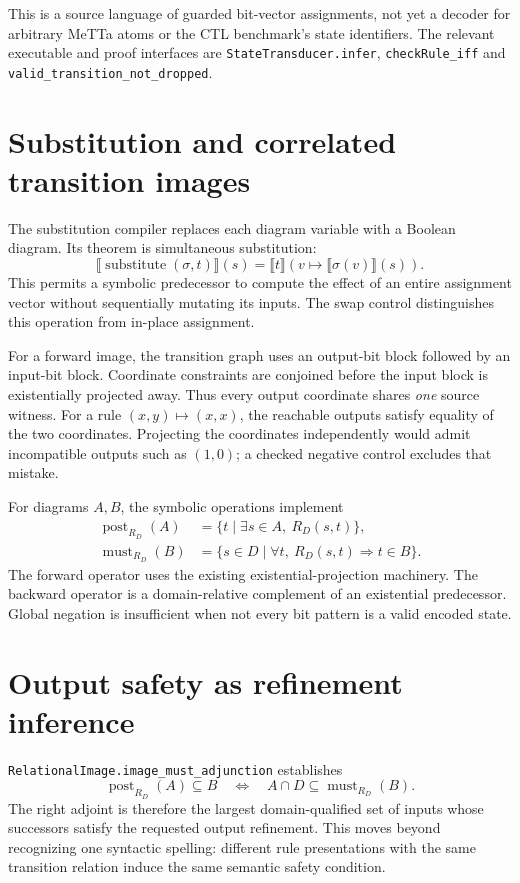 \documentclass[11pt,a4paper]{article}
\newcommand{\code}[1]{\nolinkurl{#1}}
\begin{document}
This is a source language of guarded bit-vector assignments, not yet a
decoder for arbitrary MeTTa atoms or the CTL benchmark's state identifiers.
The relevant executable and proof interfaces are
\code{StateTransducer.infer}, \code{checkRule_iff} and
\code{valid_transition_not_dropped}.

\section{Substitution and correlated transition images}

The substitution compiler replaces each diagram variable with a Boolean
diagram. Its theorem is simultaneous substitution:
\[
 \llbracket\operatorname{substitute}(\sigma,t)\rrbracket(s)
 =\llbracket t\rrbracket
       (v\mapsto\llbracket\sigma(v)\rrbracket(s)).
\]
This permits a symbolic predecessor to compute the effect of an entire
assignment vector without sequentially mutating its inputs. The swap control
distinguishes this operation from in-place assignment.

For a forward image, the transition graph uses an output-bit block followed
by an input-bit block. Coordinate constraints are conjoined before the input
block is existentially projected away. Thus every output coordinate shares
\emph{one} source witness. For a rule $(x,y)\mapsto(x,x)$, the reachable
outputs satisfy equality of the two coordinates. Projecting the coordinates
independently would admit incompatible outputs such as $(1,0)$; a checked
negative control excludes that mistake.

For diagrams $A,B$, the symbolic operations implement
\begin{align*}
 \operatorname{post}_{R_D}(A)
   &=\{t\mid\exists s\in A,\ R_D(s,t)\},\\
 \operatorname{must}_{R_D}(B)
   &=\{s\in D\mid\forall t,\ R_D(s,t)\Rightarrow t\in B\}.
\end{align*}
The forward operator uses the existing existential-projection machinery.
The backward operator is a domain-relative complement of an existential
predecessor. Global negation is insufficient when not every bit pattern is
a valid encoded state.

\section{Output safety as refinement inference}

\code{RelationalImage.image_must_adjunction} establishes
\[
 \operatorname{post}_{R_D}(A)\subseteq B
 \quad\Longleftrightarrow\quad
 A\cap D\subseteq\operatorname{must}_{R_D}(B).
\]
The right adjoint is therefore the largest domain-qualified set of inputs
whose successors satisfy the requested output refinement. This moves beyond
recognizing one syntactic spelling: different rule presentations with the
same transition relation induce the same semantic safety condition.
\end{document}
